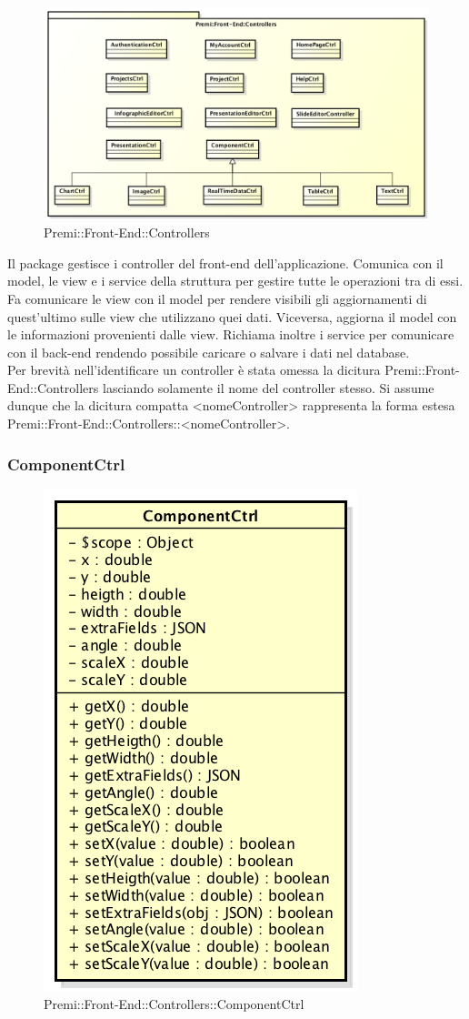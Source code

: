 \begin{figure}[h]
	\centering
	\includegraphics[width=1.0\linewidth]{img/premi_front_end_controllers}
	\caption[Premi::Front-End::Controllers]{Premi::Front-End::Controllers}
\end{figure}
Il package gestisce i controller del front-end dell'applicazione. Comunica con il model, le view e i service della struttura per gestire tutte le operazioni tra di essi. Fa comunicare le view con il model per rendere visibili gli aggiornamenti di quest'ultimo sulle view che utilizzano quei dati. Viceversa, aggiorna il model con le informazioni provenienti dalle view. Richiama inoltre i service per comunicare con il back-end rendendo possibile caricare o salvare i dati nel database.\\
Per brevità nell'identificare un controller è stata omessa la dicitura Premi::Front-End::Controllers lasciando solamente il nome del controller stesso. Si assume dunque che la dicitura compatta <nomeController> rappresenta la forma estesa Premi::Front-End::Controllers::<nomeController>.

\newpage
\subsubsection{ComponentCtrl}
	\begin{figure}[h]
		\centering
		\includegraphics[width=0.4\linewidth]{img/premi_front_end_controllers_componentctrl}
		\caption[Premi::Front-End::Controllers::ComponentCtrl]{Premi::Front-End::Controllers::ComponentCtrl}
	\end{figure}

